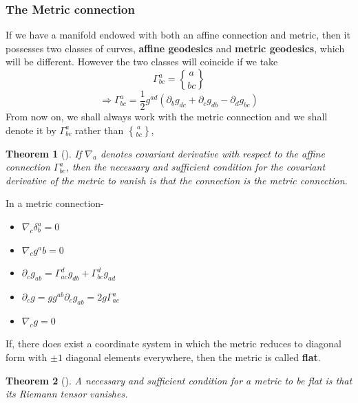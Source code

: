 \documentclass[12pt,a4paper]{article}
\numberwithin{table}{section}
\numberwithin{figure}{section}
\numberwithin{equation}{section}
\newtheorem{theorem}{Theorem}[section]
\theoremstyle{remark}
\theoremstyle{definition}
\DeclareRobustCommand{\stirling}{\genfrac\{\}{0pt}{}}
\begin{document}
\subsubsection*{The Metric connection}
If we have a manifold endowed with both an affine connection and 
metric, then it possesses two classes of curves, \textbf{affine geodesics} and \textbf{metric geodesics}, which will be different. However the two classes will coincide if we take
$$\Gamma^a_{bc}=\stirling{a}{bc}$$
$$\Rightarrow \Gamma^a_{bc}=\frac{1}{2}g^{ad}(\partial_bg_{dc}+\partial_cg_{db}-\partial_dg_{bc})$$
From now on, we shall always work with the metric connection and we shall denote it by $\Gamma^a_{bc}$ rather than $\stirling{a}{bc}$, 
\begin{theorem}[]
 If $\nabla_a$ denotes covariant derivative with respect to the affine 
connection $\Gamma^a_{bc}$, then the necessary and sufficient condition for the covariant derivative of the metric to vanish is that the connection is the metric connection.
\end{theorem}
In a metric connection-
\begin{itemize}
\item $\nabla_c\delta^a_b=0$
\item $\nabla_cg{^ab}=0$
\item $\partial_cg_{ab}=\Gamma^d_{ac}g_{db}+\Gamma^d_{bc}g_{ad}$
\item $\partial_c g=g g^{ab}\partial_cg_{ab}=2g\Gamma^a_{ac}$
\item $\nabla_c g=0 $
\end{itemize}
If, there does exist a coordinate system in which the metric reduces to diagonal form with $\pm 1$ diagonal elements everywhere, then the metric is called \textbf{flat}.
\begin{theorem}[]
A necessary and sufficient condition for a metric to be flat is that its Riemann tensor vanishes.
\end{theorem}
\end{document}
